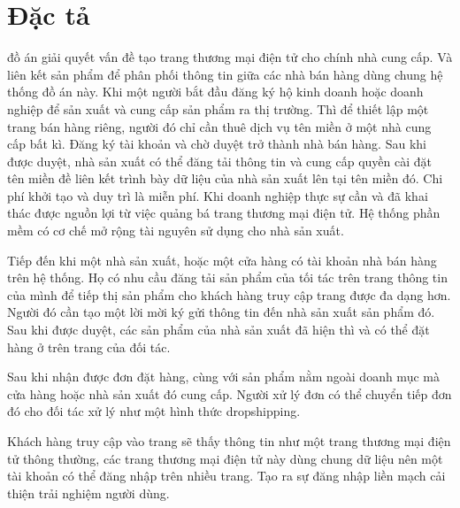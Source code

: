 	\fontsize{13px}{13px}\selectfont\justifying
	\section{Đặc tả}
	đồ án giải quyết vấn đề tạo trang thương mại điện tử cho chính nhà cung cấp. Và liên kết sản phẩm để phân phối thông tin giữa các nhà bán hàng dùng chung hệ thống đồ án này. Khi một người bắt đầu đăng ký hộ kinh doanh hoặc doanh nghiệp để sản xuất và cung cấp sản phẩm ra thị trường. Thì để thiết lập một trang bán hàng riêng, người đó chỉ cần thuê dịch vụ tên miền ở một nhà cung cấp bất kì. Đăng ký tài khoản và chờ duyệt trở thành nhà bán hàng. Sau khi được duyệt, nhà sản xuất có thể đăng tải thông tin và cung cấp quyền cài đặt tên miền đề liên kết trình bày dữ liệu của nhà sản xuất lên tại tên miền đó. Chi phí khởi tạo và duy trì là miễn phí. Khi doanh nghiệp thực sự cần và đã khai thác được nguồn lợi từ việc quảng bá trang thương mại điện tử. Hệ thống phần mềm có cơ chế mở rộng tài nguyên sử dụng cho nhà sản xuất.
	
	Tiếp đến khi một nhà sản xuất, hoặc một cửa hàng có tài khoản nhà bán hàng trên hệ thống. Họ có nhu cầu đăng tải sản phẩm của tối tác trên trang thông tin của mình để tiếp thị sản phẩm cho khách hàng truy cập trang được đa dạng hơn. Người đó cần tạo một lời mời ký gửi thông tin đến nhà sản xuất sản phẩm đó. Sau khi được duyệt, các sản phẩm của nhà sản xuất đã hiện thì và có thể đặt hàng ở trên trang của đối tác.
	
	Sau khi nhận được đơn đặt hàng, cùng với sản phẩm nằm ngoài doanh mục mà cửa hàng hoặc nhà sản xuất đó cung cấp. Người xử lý đơn có thể chuyển tiếp đơn đó cho đối tác xử lý như một hình thức \gls{dropshipping}.
	
	Khách hàng truy cập vào trang sẽ thấy thông tin như một trang thương mại điện tử thông thường, các trang thương mại điện tử này dùng chung dữ liệu nên một tài khoản có thể đăng nhập trên nhiều trang. Tạo ra sự đăng nhập liền mạch cải thiện trải nghiệm người dùng.
	

